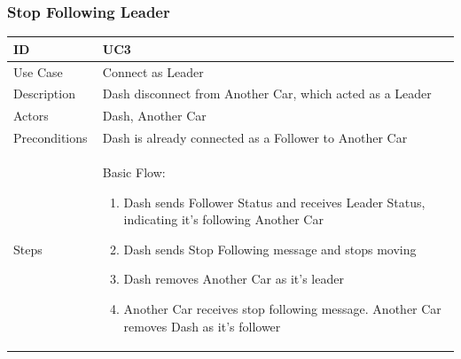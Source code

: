 \documentclass[12pt]{article}
\begin{document}
\subsubsection{Stop Following Leader}\label{us:stop follow}
\begin{longtable}{| p{0.2\linewidth} | p{0.8\linewidth} |}\hline 
    ID & UC3\\ \hline
    Use Case & Connect as Leader\\ \hline
    Description & Dash disconnect from Another Car, which acted as a Leader\\ \hline
    Actors & Dash, Another Car\\ \hline
    Preconditions & Dash is already connected as a Follower to Another Car\\ \hline
    Steps & Basic Flow: \begin{enumerate} %
        \itemsep 0em %
    	\item Dash sends Follower Status and receives Leader Status, indicating it’s following Another Car
		\item Dash sends Stop Following message and stops moving
        \item Dash removes Another Car as it’s leader
        \item Another Car receives stop following message. Another Car removes Dash as it’s follower
	\end{enumerate}\\ \hline
\end{longtable}

\end{document}
